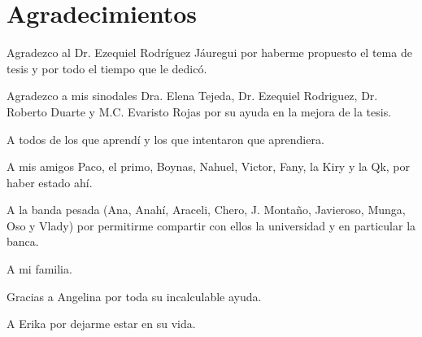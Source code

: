 \chapter*{Agradecimientos}

Agradezco al Dr. Ezequiel Rodr\'iguez J\'auregui por haberme propuesto el tema
de tesis y por todo el tiempo que le dedic\'o.

Agradezco a mis sinodales Dra. Elena Tejeda, Dr. Ezequiel Rodriguez,
Dr. Roberto Duarte y M.C. Evaristo Rojas  por su ayuda en la mejora de la tesis.

A todos de los que aprend\'i y los que intentaron que aprendiera.

A mis amigos Paco, el primo, Boynas, Nahuel, Victor, Fany, la Kiry y la Qk, por
haber estado ah\'i. 

A la banda pesada (Ana, Anah\'i, Araceli, Chero, J. Monta\~no, Javieroso, Munga,
Oso y Vlady) por permitirme compartir con ellos la universidad y en particular
la banca.

A mi familia.

Gracias a Angelina por toda su incalculable ayuda.

A Erika por dejarme estar en su vida. 

